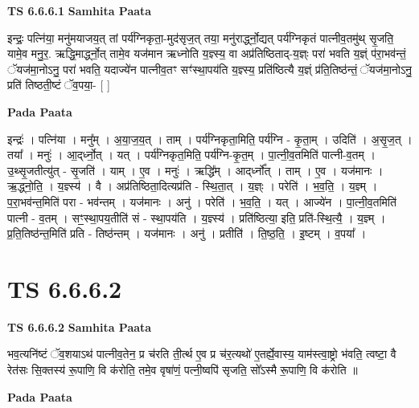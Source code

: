 \documentclass[17pt]{extarticle}
\begin{document}
\textbf{TS 6.6.6.1 } \newline
\textbf{Samhita Paata} \newline

इन्द्रः॒ पत्नि॑या॒ मनु॑मयाजय॒त् तां पर्य॑ग्निकृता॒-मुद॑सृज॒त् तया॒ मनु॑रार्द्ध्नो॒द्यत् पर्य॑ग्निकृतं पात्नीव॒तमु॑थ् सृ॒जति॒ यामे॒व मनु॒र॒. ऋद्धि॒मार्द्ध्नो॒त् तामे॒व यज॑मान ऋध्नोति य॒ज्ञ्स्य॒ वा अप्र॑तिष्ठिताद्-य॒ज्ञ्ः परा॑ भवति य॒ज्ञ्ं प॑रा॒भव॑न्तं॒ ॅयज॑मा॒नोऽनु॒ परा॑ भवति॒ यदाज्ये॑न पात्नीव॒तꣳ सꣳ॑स्था॒पय॑ति य॒ज्ञ्स्य॒ प्रति॑ष्ठित्यै य॒ज्ञ्ं प्र॑ति॒तिष्ठ॑न्तं॒ ॅयज॑मा॒नोऽनु॒ प्रति॑ तिष्ठती॒ष्टं ॅव॒पया॒- [  ] \newline

\textbf{Pada Paata} \newline

इन्द्रः॑ । पत्नि॑या । मनु᳚म् । अ॒या॒ज॒य॒त् । ताम् । पर्य॑ग्निकृता॒मिति॒ पर्य॑ग्नि - कृ॒ता॒म् । उदिति॑ । अ॒सृ॒ज॒त् । तया᳚ । मनुः॑ । आ॒द्‌र्ध्नो॒त् । यत् । पर्य॑ग्निकृत॒मिति॒ पर्य॑ग्नि-कृ॒त॒म् । पा॒त्नी॒व॒तमिति॑ पात्नी-व॒तम् । उ॒थ्सृ॒जतीत्यु॑त् - सृ॒जति॑ । याम् । ए॒व । मनुः॑ । ऋद्धि᳚म् । आद्‌र्ध्नो᳚त् । ताम् । ए॒व । यज॑मानः । ऋ॒द्ध्नो॒ति॒ । य॒ज्ञ्स्य॑ । वै । अप्र॑तिष्ठिता॒दित्यप्र॑ति - स्थि॒ता॒त् । य॒ज्ञ्ः । परेति॑ । भ॒व॒ति॒ । य॒ज्ञ्म् । प॒रा॒भव॑न्त॒मिति॑ परा - भव॑न्तम् । यज॑मानः । अनु॑ । परेति॑ । भ॒व॒ति॒ । यत् । आज्ये॑न । पा॒त्नी॒व॒तमिति॑ पात्नी - व॒तम् । सꣳ॒॒स्था॒पय॒तीति॑ सं - स्था॒पय॑ति । य॒ज्ञ्स्य॑ । प्रति॑ष्ठित्या॒ इति॒ प्रति॑-स्थि॒त्यै॒ । य॒ज्ञ्म् । प्र॒ति॒तिष्ठ॑न्त॒मिति॑ प्रति - तिष्ठ॑न्तम् । यज॑मानः । अनु॑ । प्रतीति॑ । ति॒ष्ठ॒ति॒ । इ॒ष्टम् । व॒पया᳚ ।  \newline





\section{ TS 6.6.6.2 }

\textbf{TS 6.6.6.2 } \newline
\textbf{Samhita Paata} \newline

भव॒त्यनि॑ष्टं ॅव॒शयाऽथ॑ पात्नीव॒तेन॒ प्र च॑रति ती॒र्त्थ ए॒व प्र च॑र॒त्यथो॑ ए॒तर्ह्ये॒वास्य॒ याम॑स्त्वा॒ष्ट्रो भ॑वति॒ त्वष्टा॒ वै रेत॑सः सि॒क्तस्य॑ रू॒पाणि॒ वि क॑रोति॒ तमे॒व वृषा॑णं॒ पत्नी॒ष्वपि॑ सृजति॒ सो᳚ऽस्मै रू॒पाणि॒ वि क॑रोति ॥ \newline

\textbf{Pada Paata} \newline
\end{document}
